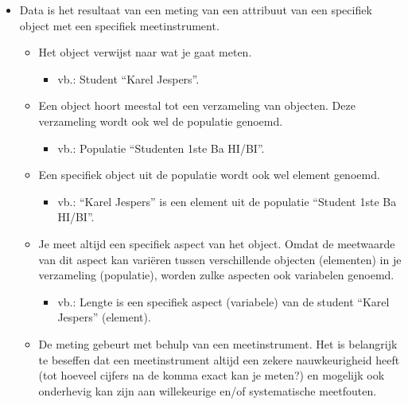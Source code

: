 \documentclass[]{tufte-book}
\providecommand{\tightlist}{%
  \setlength{\itemsep}{0pt}\setlength{\parskip}{0pt}}
\begin{document}
\begin{itemize}
\tightlist
\item
  Data is het resultaat van een meting van een attribuut van een specifiek object met een specifiek meetinstrument.

  \begin{itemize}
  \tightlist
  \item
    Het object verwijst naar wat je gaat meten.

    \begin{itemize}
    \tightlist
    \item
      vb.: Student ``Karel Jespers''.
    \end{itemize}
  \item
    Een object hoort meestal tot een verzameling van objecten. Deze verzameling wordt ook wel de populatie genoemd.

    \begin{itemize}
    \tightlist
    \item
      vb.: Populatie ``Studenten 1ste Ba HI/BI''.
    \end{itemize}
  \item
    Een specifiek object uit de populatie wordt ook wel element genoemd.

    \begin{itemize}
    \tightlist
    \item
      vb.: ``Karel Jespers'' is een element uit de populatie ``Student 1ste Ba HI/BI''.
    \end{itemize}
  \item
    Je meet altijd een specifiek aspect van het object. Omdat de meetwaarde van dit aspect kan variëren tussen verschillende objecten (elementen) in je verzameling (populatie), worden zulke aspecten ook variabelen genoemd.

    \begin{itemize}
    \tightlist
    \item
      vb.: Lengte is een specifiek aspect (variabele) van de student ``Karel Jespers'' (element).
    \end{itemize}
  \item
    De meting gebeurt met behulp van een meetinstrument. Het is belangrijk te beseffen dat een meetinstrument altijd een zekere nauwkeurigheid heeft (tot hoeveel cijfers na de komma exact kan je meten?) en mogelijk ook onderhevig kan zijn aan willekeurige en/of systematische meetfouten.


\end{itemize}
\end{itemize}
\end{document}
